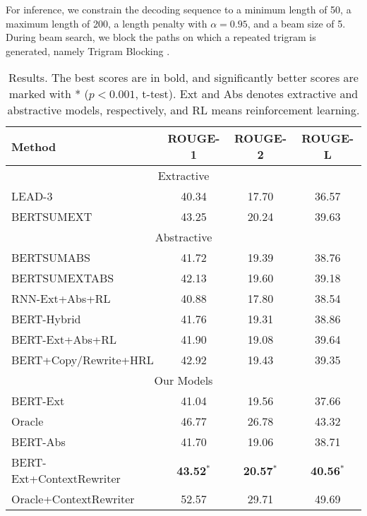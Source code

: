 \documentclass[letterpaper]{article} %
\begin{document}
For inference, we constrain the decoding sequence to a minimum length of 50, a maximum length of 200, a length penalty \cite{Wu2016} with $\alpha=0.95$, and a beam size of 5. During beam search, we block the paths on which a repeated trigram is generated, namely Trigram Blocking \cite{Paulus2018}.



\begin{table*}[t]
    \centering
    \begin{tabular}{lccc}
        \hline
        \bf{Method} & \bf{ ROUGE-1 } & \bf{ ROUGE-2 } & \bf{ ROUGE-L} \\
        \hline
        \multicolumn{4}{c}{Extractive}  \\
        \hline
        LEAD-3 \cite{See2017} & 40.34 & 17.70 & 36.57 \\
        BERTSUMEXT \cite{Liu2019} & 43.25 & 20.24 & 39.63 \\
        \hline
        \multicolumn{4}{c}{Abstractive}  \\
        \hline
        BERTSUMABS \cite{Liu2019} & 41.72 & 19.39 & 38.76 \\
        BERTSUMEXTABS \cite{Liu2019} & 42.13 & 19.60 & 39.18 \\
        \hline
        RNN-Ext+Abs+RL \cite{Chen2018} & 40.88 & 17.80 & 38.54 \\
        BERT-Hybrid \cite{Wei2019} & 41.76 & 19.31 & 38.86 \\
        BERT-Ext+Abs+RL \cite{Bae2019} & 41.90 & 19.08 & 39.64 \\
        BERT+Copy/Rewrite+HRL \cite{Xiao2020} & 42.92 & 19.43 & 39.35 \\
        \hline
        \multicolumn{4}{c}{Our Models}  \\
        \hline
        BERT-Ext & 41.04 & 19.56 & 37.66 \\
        Oracle & 46.77 & 26.78 & 43.32 \\
        \hline
        BERT-Abs & 41.70 & 19.06 & 38.71 \\
        BERT-Ext+ContextRewriter & \bf{43.52}$^*$ & \bf{20.57}$^*$ & \bf{40.56}$^*$ \\
        Oracle+ContextRewriter  & 52.57 & 29.71 & 49.69  \\
        \hline
    \end{tabular}
    \caption{Results. The best scores are in bold, and significantly better scores are marked with * ($p<0.001$, t-test). Ext and Abs denotes extractive and abstractive models, respectively, and RL means reinforcement learning.}
    \label{tab:mainresults}
\end{table*}
\end{document}
